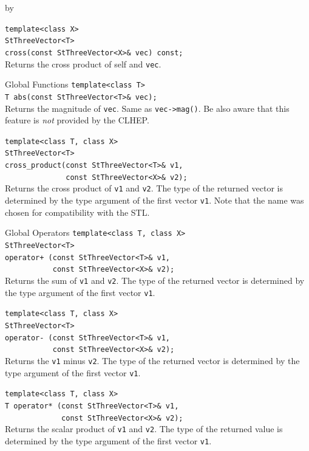 \documentclass[twoside]{article}
\newcommand{\comp}[1]{\texttt{#1}}%
\newcommand{\entrylabel}[1]{\mbox{\textbf{{#1}}}\hfil}%
\newenvironment{entry}
{\begin{list}{}%
    {\renewcommand{\makelabel}{\entrylabel}%
     \setlength{\labelwidth}{90pt}%
     \setlength{\leftmargin}{\labelwidth}
     \advance\leftmargin by \labelsep%
      }%
    }%
  {\end{list}}
\newcommand{\Entrylabel}[1]%
{\raisebox{0pt}[1ex][0pt]{\makebox[\labelwidth][l]%
    {\parbox[t]{\labelwidth}{\hspace{0pt}\textbf{{#1}}}}}}
\newenvironment{Entry}%
{\renewcommand{\entrylabel}{\Entrylabel}\begin{entry}}%
  {\end{entry}}
\begin{document}
\begin{Entry}
    \verb+template<class X>+\\
    \verb+StThreeVector<T>+\\
    \verb+cross(const StThreeVector<X>& vec) const;+\\
    Returns the cross product of self and \comp{vec}.
    
\item[Global Functions]
    \verb+template<class T>+\\
    \verb+T abs(const StThreeVector<T>& vec);+\\ 
    Returns the magnitude of \comp{vec}. Same as
    \verb+vec->mag()+.
    Be also aware that this feature is {\em not} provided by
    the CLHEP.
    
    \verb+template<class T, class X>+\\
    \verb+StThreeVector<T>+\\
    \verb+cross_product(const StThreeVector<T>& v1,+\\
    \verb+              const StThreeVector<X>& v2);+\\
    Returns the cross product of \comp{v1} and \comp{v2}.
    The type of the returned vector is determined by the type
    argument of the first vector \comp{v1}. Note that the
    name was chosen for compatibility with the STL.
    
\item[Global Operators]
    \verb+template<class T, class X>+\\
    \verb+StThreeVector<T>+\\
    \verb#operator+ (const StThreeVector<T>& v1,#\\
    \verb+           const StThreeVector<X>& v2);+\\
    Returns the sum of \comp{v1} and \comp{v2}.
    The type of the returned vector is determined by the type
    argument of the first vector \comp{v1}.
    
    \verb+template<class T, class X>+\\
    \verb+StThreeVector<T>+\\
    \verb+operator- (const StThreeVector<T>& v1,+\\
    \verb+           const StThreeVector<X>& v2);+\\
    Returns the \comp{v1} minus \comp{v2}.
    The type of the returned vector is determined by the type
    argument of the first vector \comp{v1}.
     
    \verb+template<class T, class X>+\\
    \verb+T operator* (const StThreeVector<T>& v1,+\\
    \verb+             const StThreeVector<X>& v2);+\\
    Returns the scalar product of \comp{v1} and \comp{v2}.
    The type of the returned value is determined by the type
    argument of the first vector \comp{v1}.
    

\end{Entry}
\end{document}
